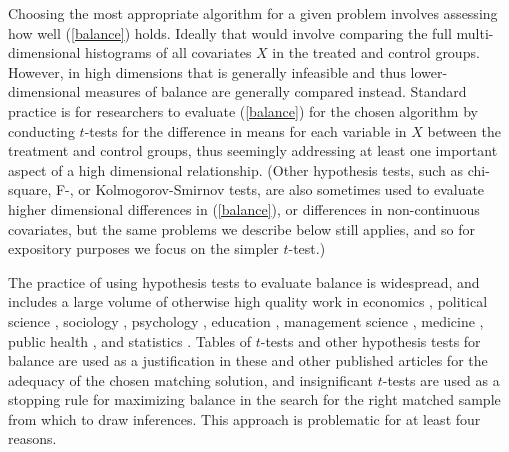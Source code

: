 \documentclass[11pt,titlepage]{article}
\begin{document}
Choosing the most appropriate algorithm for a given problem involves assessing how well
(\ref{balance}) holds.  Ideally that would involve comparing the full multi-dimensional histograms of all
covariates $X$ in the treated and control groups.  However, in high dimensions that is generally
infeasible and thus lower-dimensional measures of balance are generally compared instead.
Standard practice is for researchers to evaluate (\ref{balance}) for
the chosen algorithm by conducting $t$-tests for the difference in
means for each variable in $X$ between the treatment and control
groups, thus seemingly addressing at least one important aspect of a
high dimensional relationship.  (Other hypothesis tests, such as chi-square, F-, or 
Kolmogorov-Smirnov tests, are also
sometimes used to evaluate higher dimensional differences in
(\ref{balance}), or differences in non-continuous covariates,
but the same problems we describe below still
applies, and so for expository purposes we focus on the simpler
$t$-test.)

The practice of 
using hypothesis tests to evaluate balance is
widespread, and includes a large volume of otherwise high quality work
in economics \citep{LisMilFre03,BlaSmi04,AgoDyn04,DehWah99,
  DehWah02,SmiTod05}, political science \citep{Imai05,SimHop05},
sociology \citep{LunSmi05}, psychology
\citep{HavNag05,HilWalBro05,YosMagBos03,JonDAgGon04,McCRidMor04},
education \citep{Crosnoe05,SchBuc03}, management science
\citep{FreMil04, Villalonga04,WanSchAvo05}, medicine
\citep{WanSchAvo05, MacRivJur06,LinPekWan05,ManTudDie06, PetRoeMul06,
  ShiLitPot06,SabCanGib05,PerTuUnd00,AusMam06,AusMamStu05}, public
health \citep{NovReaRau06,ElBGilWu05,LauSmiSta00,BinBreEar05}, and
statistics \citep{LuZanHor01}.  Tables of $t$-tests and other
hypothesis tests for balance are used as a justification in these and
other published articles for the adequacy of the chosen matching
solution, and insignificant $t$-tests are used as a stopping rule
for maximizing balance in the search for the right
matched sample from which to draw inferences.  This approach is problematic
for at least four reasons.
\end{document}
